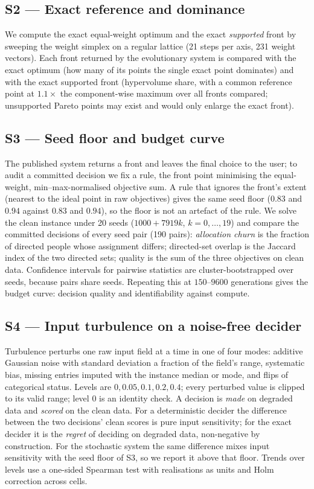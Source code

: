 \documentclass[systems,article,submit,moreauthors,pdftex]{Definitions/mdpi}
\begin{document}
\subsection{S2 --- Exact reference and dominance}
We compute the exact equal-weight optimum and the exact \emph{supported} front by sweeping
the weight simplex on a regular lattice (21 steps per axis, 231 weight vectors). Each front
returned by the evolutionary system is compared with the exact optimum (how many of its
points the single exact point dominates) and with the exact supported front (hypervolume
share, with a common reference point at $1.1\times$ the component-wise maximum over all
fronts compared; unsupported Pareto points may exist and would only enlarge the exact
front).

\subsection{S3 --- Seed floor and budget curve}
The published system returns a front and leaves the final choice to the user; to audit a
committed decision we fix a rule, the front point minimising the equal-weight,
min--max-normalised objective sum. A rule that ignores the front's extent (nearest to the
ideal point in raw objectives) gives the same seed floor ($0.83$ and $0.94$ against $0.83$
and $0.94$), so the floor is not an artefact of the rule. We solve the clean instance under 20 seeds
($1000 + 7919k$, $k = 0,\dots,19$) and compare the committed decisions of every seed pair
(190 pairs): \emph{allocation churn} is the fraction of directed people whose assignment
differs; directed-set overlap is the Jaccard index of the two directed sets; quality is the
sum of the three objectives on clean data. Confidence intervals for pairwise statistics are
cluster-bootstrapped over seeds, because pairs share seeds. Repeating this at
$150$--$9600$ generations gives the budget curve: decision quality and identifiability
against compute.

\subsection{S4 --- Input turbulence on a noise-free decider}
Turbulence perturbs one raw input field at a time in one of four modes: additive Gaussian
noise with standard deviation a fraction of the field's range, systematic bias, missing
entries imputed with the instance median or mode, and flips of categorical status. Levels
are $0, 0.05, 0.1, 0.2, 0.4$; every perturbed value is clipped to its valid range; level
$0$ is an identity check. A decision is \emph{made} on degraded data and \emph{scored} on
the clean data. For a deterministic decider the difference between the two decisions'
clean scores is pure input sensitivity; for the exact decider it is the \emph{regret} of
deciding on degraded data, non-negative by construction. For the stochastic system the same
difference mixes input sensitivity with the seed floor of S3, so we report it above that
floor. Trends over levels use a one-sided Spearman test with realisations as units and Holm
correction across cells.
\end{document}

